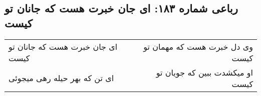 \begin{center}
\section*{رباعی شماره ۱۸۳: ای جان خبرت هست که جانان تو کیست}
\label{sec:0183}
\begin{longtable}{l p{0.5cm} r}
ای جان خبرت هست که جانان تو کیست
&&
وی دل خبرت هست که مهمان تو کیست
\\
ای تن که بهر حیله رهی میجوئی
&&
او میکشدت ببین که جویان تو کیست
\\
\end{longtable}
\end{center}
